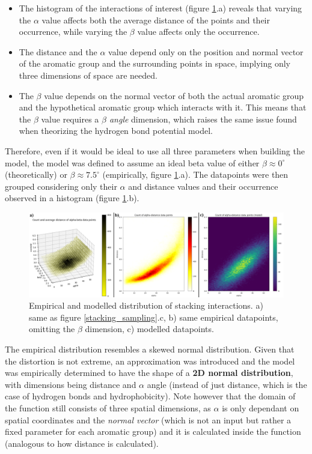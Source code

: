       \begin{itemize}
        \item The histogram of the interactions of interest (figure \ref{fig:results/stacking_modeling}.a) reveals that varying the $\alpha$ value affects both the average distance of the points and their occurrence, while varying the $\beta$ value affects only the occurrence.
        \item The distance and the $\alpha$ value depend only on the position and normal vector of the aromatic group and the surrounding points in space, implying only three dimensions of space are needed.
        \item The $\beta$ value depends on the normal vector of both the actual aromatic group and the hypothetical aromatic group which interacts with it. This means that the $\beta$ value requires a \textit{$\beta$ angle} dimension, which raises the same issue found when theorizing the hydrogen bond potential model.
      \end{itemize}

      Therefore, even if it would be ideal to use all three parameters when building the model, the model was defined to assume an ideal beta value of either $\beta \approx 0^{\circ}$ (theoretically) or $\beta \approx 7.5^{\circ}$ (empirically, figure \ref{fig:results/stacking_modeling}.a). The datapoints were then grouped considering only their $\alpha$ and distance values and their occurrence observed in a histogram (figure \ref{fig:results/stacking_modeling}.b).

      \begin{figure}[H]
        \centering
        \includegraphics[width=1\textwidth]{figures/results/stacking_modeling.png}
        \caption{\label{fig:results/stacking_modeling} Empirical and modelled distribution of stacking interactions. a) same as figure \ref{stacking_sampling}.c, b) same empirical datapoints, omitting the $\beta$ dimension, c) modelled datapoints.}
      \end{figure}

      The empirical distribution resembles a skewed normal distribution. Given that the distortion is not extreme, an approximation was introduced and the model was empirically determined to have the shape of a \textbf{2D normal distribution}, with dimensions being distance and $\alpha$ angle (instead of just distance, which is the case of hydrogen bonds and hydrophobicity). Note however that the domain of the function still consists of three spatial dimensions, as $\alpha$ is only dependant on spatial coordinates and the \textit{normal vector} (which is not an input but rather a fixed parameter for each aromatic group) and it is calculated inside the function (analogous to how distance is calculated).

